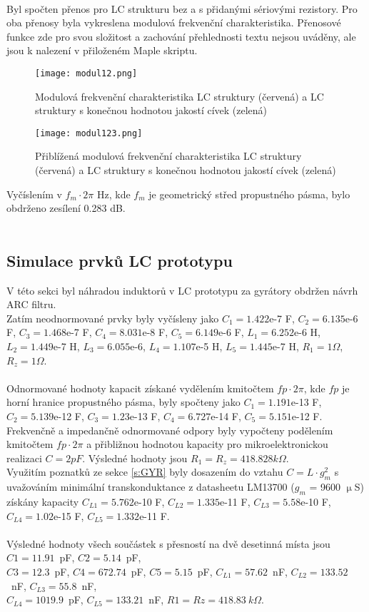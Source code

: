 \\
\noindent Byl spočten přenos pro LC strukturu bez a s přidanými sériovými rezistory. Pro oba přenosy byla vykreslena modulová frekvenční charakteristika. Přenosové funkce zde pro svou složitost a zachování přehlednosti textu nejsou uváděny, ale jsou k nalezení v přiloženém Maple skriptu.
\begin{figure}[h]
\centering
\texttt{[image: modul12.png]}
\caption{Modulová frekvenční charakteristika LC struktury (červená) a LC struktury s konečnou hodnotou jakostí cívek (zelená)}
\end{figure}
\begin{figure}[h]
\centering
\texttt{[image: modul123.png]}
\caption{Přiblížená modulová frekvenční charakteristika LC struktury (červená) a LC struktury s konečnou hodnotou jakostí cívek (zelená)}
\end{figure}
\noindent Vyčíslením v $f_m \cdot 2 \pi$ Hz, kde $f_m$ je geometrický střed propustného pásma, bylo obdrženo zesílení 0.283 dB.\\
\\
\subsection{Simulace prvků LC prototypu}\label{s:ARC}
V této sekci byl náhradou induktorů v LC prototypu za gyrátory obdržen návrh ARC filtru.\\
Zatím neodnormované prvky byly vyčísleny jako $C_1 = 1.422$e-7 F, $C_2 = 6.135$e-6 F, $C_3 = 1.468$e-7 F, $C_4 = 8.031$e-8 F, $C_5 = 6.149$e-6 F, $L_1 = 6.252$e-6 H, $L_2 = 1.449$e-7 H, $L_3 = 6.055$e-6, $L_4 = 1.107$e-5 H, $L_5 = 1.445$e-7 H, $R_1 = 1 \Omega$, $R_z = 1 \Omega$.\\
\\
\noindent Odnormované hodnoty kapacit získané vydělením kmitočtem $fp \cdot 2 \pi$, kde $fp$ je horní hranice propustného pásma, byly spočteny jako $C_1 = 1.191$e-13 F, $C_2 = 5.139$e-12 F, $C_3 = 1.23$e-13 F, $C_4 = 6.727$e-14 F, $C_5 = 5.151$e-12 F.\\
\noindent Frekvenčně a impedančně odnormované odpory byly vypočteny podělením kmitočtem $fp \cdot 2 \pi$ a přibližnou hodnotou kapacity pro mikroelektronickou realizaci $C = 2 pF$. Výsledné hodnoty jsou $R_1 = R_z = 418.828 k\Omega$.\\
\noindent Využitím poznatků ze sekce \ref{s:GYR} byly dosazením do vztahu $C = L \cdot g_m^2$ s uvažováním minimální transkonduktance z datasheetu LM13700 ($g_m$ = 9600 $\upmu$S) získány kapacity $C_{L1} = 5.762$e-10 F, $C_{L2} = 1.335$e-11 F, $C_{L3} = 5.58$e-10 F, $C_{L4} = 1.02$e-15 F, $C_{L5} = 1.332$e-11 F.\\
\\
\noindent Výsledné hodnoty všech součástek s přesností na dvě desetinná místa jsou $C1 = 11.91$~pF, $C2 = 5.14$~pF, \\$C3 = 12.3$~pF, $C4 = 672.74$~pF, $C5 = 5.15$~pF, $C_{L1} = 57.62$~nF, $C_{L2} = 133.52$~nF, $C_{L3} = 55.8$~nF, \\$C_{L4} = 1019.9$~pF, $C_{L5} = 133.21$~nF, $R1 = Rz = 418.83\ k\Omega$.

